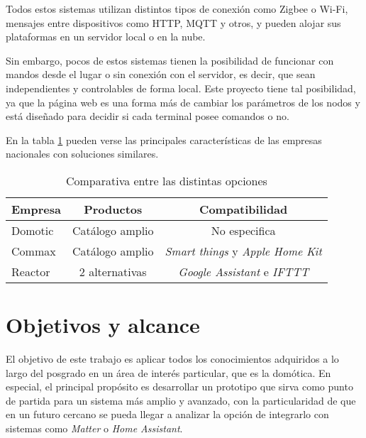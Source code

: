 Todos estos sistemas utilizan distintos tipos de conexión como Zigbee o Wi-Fi, mensajes entre dispositivos como HTTP, MQTT y otros, y pueden alojar sus plataformas en un servidor local o en la nube.

Sin embargo, pocos de estos sistemas tienen la posibilidad de funcionar con mandos desde el lugar o sin conexión con el servidor, es decir, que sean independientes y controlables de forma local. Este proyecto tiene tal posibilidad, ya que la página web es una forma más de cambiar los parámetros de los nodos y está diseñado para decidir si cada terminal posee comandos o no.

En la tabla \ref{tab:empresas} pueden verse las principales características de las empresas nacionales con soluciones similares.

\begin{table}[h]
\centering
\caption[Comparativa entre las distintas opciones del mercado nacional]{Comparativa entre las distintas opciones}
\begin{tabular}{l c c}
\toprule
\textbf{Empresa} & \textbf{Productos} & \textbf{Compatibilidad}\\
\midrule
Domotic	& Catálogo amplio & No especifica \\
Commax	& Catálogo amplio & \textit{Smart things} y \textit{Apple Home Kit}	\\
Reactor	& 2 alternativas & \textit{Google Assistant} e \textit{IFTTT} \\
\bottomrule
\hline
\end{tabular}
\label{tab:empresas}
\end{table}

\section{Objetivos y alcance}

El objetivo de este trabajo es aplicar todos los conocimientos adquiridos a lo largo del posgrado en un área de interés particular, que es la domótica. En especial, el principal propósito es desarrollar un prototipo que sirva como punto de partida para un sistema más amplio y avanzado, con la particularidad de que en un futuro cercano se pueda llegar a analizar la opción de integrarlo con sistemas como \textit{Matter} o \textit{Home Assistant}.

